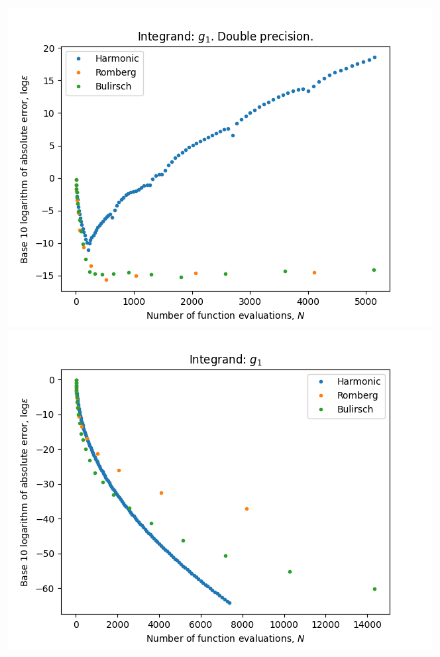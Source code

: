 \begin{figure}[H]
\centering
\begin{minipage}{0.45\textwidth}
\centering
\includegraphics[scale=0.45]{../results/romberg_plots/g_one.png}
\end{minipage}
\begin{minipage}{0.45\textwidth}
\centering
\includegraphics[scale=0.45]{../results/romberg_plots/g_one_hp.png}
\end{minipage}
\end{figure}

